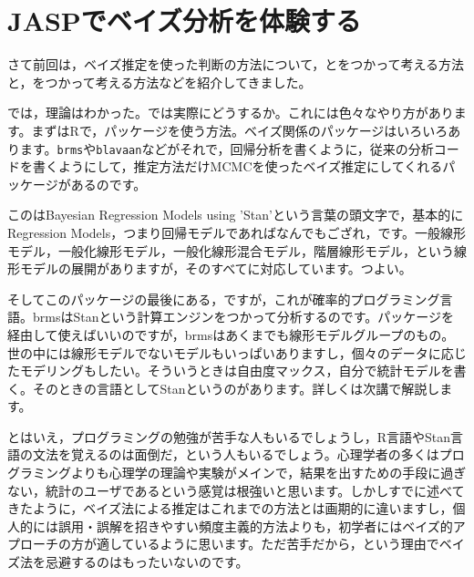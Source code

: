 \documentclass{ltjbook}
\begin{document}
\VerbatimFootnotes

\chapter{JASPでベイズ分析を体験する}
\label{ch28_bayesian_with_JASP}


さて前回は，ベイズ推定を使った判断の方法について，とをつかって考える方法と，をつかって考える方法などを紹介してきました。

では，理論はわかった。では実際にどうするか。これには色々なやり方があります。まずはRで，パッケージを使う方法。ベイズ関係のパッケージはいろいろあります。\verb|brms|\parencite{brmsCite1,brmsCite2}や\verb|blavaan|\parencite{blavaanCite1,blavaanCite2}などがそれで，回帰分析を書くように，従来の分析コードを書くようにして，推定方法だけMCMCを使ったベイズ推定にしてくれるパッケージがあるのです。

このはBayesian Regression Models using 'Stan'という言葉の頭文字で，基本的にRegression Models，つまり回帰モデルであればなんでもござれ，です。一般線形モデル，一般化線形モデル，一般化線形混合モデル，階層線形モデル，という線形モデルの展開がありますが，そのすべてに対応しています。つよい。

そしてこのパッケージの最後にある，ですが，これが確率的プログラミング言語。brmsはStanという計算エンジンをつかって分析するのです。パッケージを経由して使えばいいのですが，brmsはあくまでも線形モデルグループのもの。世の中には線形モデルでないモデルもいっぱいありますし，個々のデータに応じたモデリングもしたい。そういうときは自由度マックス，自分で統計モデルを書く。そのときの言語としてStanというのがあります。詳しくは次講で解説します。

とはいえ，プログラミングの勉強が苦手な人もいるでしょうし，R言語やStan言語の文法を覚えるのは面倒だ，という人もいるでしょう。心理学者の多くはプログラミングよりも心理学の理論や実験がメインで，結果を出すための手段に過ぎない，統計のユーザであるという感覚は根強いと思います。しかしすでに述べてきたように，ベイズ法による推定はこれまでの方法とは画期的に違いますし，個人的には誤用・誤解を招きやすい頻度主義的方法よりも，初学者にはベイズ的アプローチの方が適しているように思います。ただ苦手だから，という理由でベイズ法を忌避するのはもったいないのです。
\end{document}
